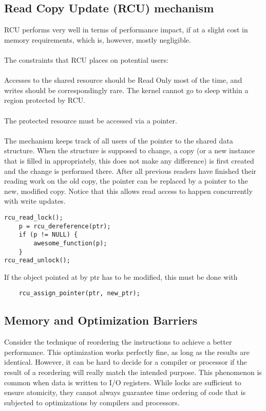 \documentclass[a4paper]{article}
\begin{document}
\subsection{Read Copy Update (RCU) mechanism}

RCU performs very well in terms of performance impact, if at a
slight cost in memory requirements, which is, however, mostly negligible.
\\~\\
The constraints that
RCU places on potential users:
\\~\\
Accesses to the shared resource should be Read Only most of the time, and writes should be
correspondingly rare.
The kernel cannot go to sleep within a region protected by RCU.
\\~\\
The protected resource must be accessed via a pointer.
\\~\\
The mechanism keeps track of all users of the pointer to the shared
data structure. When the structure is supposed to change, a copy (or a new instance that is filled in
appropriately, this does not make any difference) is first created and the change is performed there. After
all previous readers have finished their reading work on the old copy, the pointer can be replaced by a
pointer to the new, modified copy. Notice that this allows read access to happen concurrently with write
updates.

\begin{verbatim}
rcu_read_lock();
    p = rcu_dereference(ptr);
    if (p != NULL) {
        awesome_function(p);
    }
rcu_read_unlock();
\end{verbatim}


If the object pointed at by ptr has to be modified, this must be done with 

\begin{verbatim}
    rcu_assign_pointer(ptr, new_ptr);
\end{verbatim}

\subsection{Memory and Optimization Barriers}

Consider the technique of reordering the instructions to achieve a better performance. This optimization works perfectly fine, as long as the results are identical. However, it can be hard to decide for a compiler or processor if the result of a reordering will really match the intended purpose. This phenomenon is common
when data is written to I/O registers. While locks are sufficient to ensure atomicity, they cannot always guarantee time ordering of code that is subjected to optimizations by compilers and processors.
\end{document}
